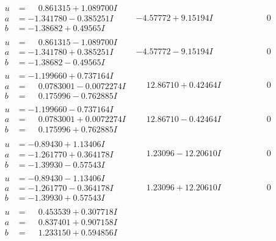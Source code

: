 \documentclass[1p]{elsarticle_modified}
\theoremstyle{definition}
\begin{document}
$$\begin{array}{c|c|c}
 \hline 
\begin{aligned}
u &= \phantom{-}0.861315 + 1.089700 I \\
a &= -1.341780 - 0.385251 I \\
b &= -1.38682 + 0.49565 I\end{aligned}
 & -4.57772 + 9.15194 I & \phantom{-0.000000 } 0 \\ \hline\begin{aligned}
u &= \phantom{-}0.861315 - 1.089700 I \\
a &= -1.341780 + 0.385251 I \\
b &= -1.38682 - 0.49565 I\end{aligned}
 & -4.57772 - 9.15194 I & \phantom{-0.000000 } 0 \\ \hline\begin{aligned}
u &= -1.199660 + 0.737164 I \\
a &= \phantom{-}0.0783001 - 0.0072274 I \\
b &= \phantom{-}0.175996 - 0.762885 I\end{aligned}
 & \phantom{-}12.86710 + 0.42464 I & \phantom{-0.000000 } 0 \\ \hline\begin{aligned}
u &= -1.199660 - 0.737164 I \\
a &= \phantom{-}0.0783001 + 0.0072274 I \\
b &= \phantom{-}0.175996 + 0.762885 I\end{aligned}
 & \phantom{-}12.86710 - 0.42464 I & \phantom{-0.000000 } 0 \\ \hline\begin{aligned}
u &= -0.89430 + 1.13406 I \\
a &= -1.261770 + 0.364178 I \\
b &= -1.39930 - 0.57543 I\end{aligned}
 & \phantom{-}1.23096 - 12.20610 I & \phantom{-0.000000 } 0 \\ \hline\begin{aligned}
u &= -0.89430 - 1.13406 I \\
a &= -1.261770 - 0.364178 I \\
b &= -1.39930 + 0.57543 I\end{aligned}
 & \phantom{-}1.23096 + 12.20610 I & \phantom{-0.000000 } 0 \\ \hline\begin{aligned}
u &= \phantom{-}0.453539 + 0.307718 I \\
a &= \phantom{-}0.837401 + 0.907158 I \\
b &= \phantom{-}1.233150 + 0.594856 I\end{aligned}

\end{array}$$
\end{document}
